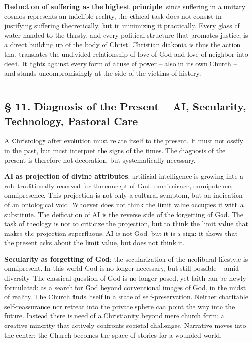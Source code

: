 \documentclass[
  english,
]{article}
\begin{document}
\textbf{Reduction of suffering as the highest principle}: since
suffering in a unitary cosmos represents an indelible reality, the
ethical task does not consist in justifying suffering theoretically, but
in minimizing it practically. Every glass of water handed to the
thirsty, and every political structure that promotes justice, is a
direct building up of the body of Christ. Christian diakonia is thus the
action that translates the undivided relationship of love of God and
love of neighbor into deed. It fights against every form of abuse of
power -- also in its own Church -- and stands uncompromisingly at the
side of the victims of history.

\begin{center}\rule{0.5\linewidth}{0.5pt}\end{center}

\subsection{§ 11. Diagnosis of the Present -- AI, Secularity,
Technology, Pastoral
Care}\label{diagnosis-of-the-present-ai-secularity-technology-pastoral-care}

A Christology after evolution must relate itself to the present. It must
not ossify in the past, but must interpret the signs of the times. The
diagnosis of the present is therefore not decoration, but systematically
necessary.

\textbf{AI as projection of divine attributes}: artificial intelligence
is growing into a role traditionally reserved for the concept of God:
omniscience, omnipotence, omnipresence. This projection is not only a
cultural symptom, but an indication of an ontological void. Whoever does
not think the limit value occupies it with a substitute. The deification
of AI is the reverse side of the forgetting of God. The task of theology
is not to criticize the projection, but to think the limit value that
makes the projection superfluous. AI is not God, but it is a sign: it
shows that the present asks about the limit value, but does not think
it.

\textbf{Secularity as forgetting of God}: the secularization of the
neoliberal lifestyle is omnipresent. In this world God is no longer
necessary, but still possible -- amid diversity. The classical question
of God is no longer posed, yet faith can be newly formulated: as a
search for God beyond conventional images of God, in the midst of
reality. The Church finds itself in a state of self-preservation.
Neither charitable self-reassurance nor retreat into the private sphere
can point the way into the future. Instead there is need of a
Christianity beyond mere church form: a creative minority that actively
confronts societal challenges. Narrative moves into the center: the
Church becomes the space of stories for a wounded world.
\end{document}
